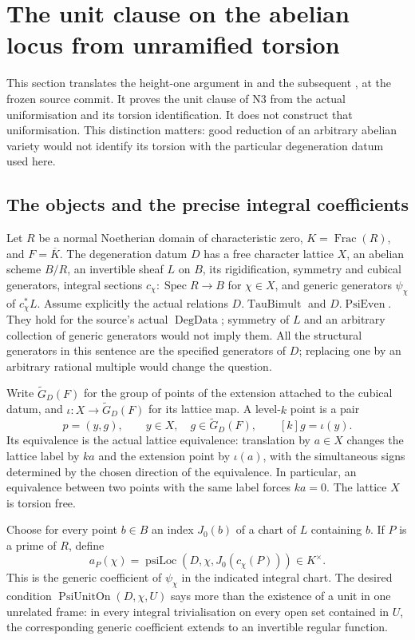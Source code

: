 \section{The unit clause on the abelian locus from unramified torsion}
\label{sec:psi-unit-source}
This section translates the height-one argument in
 and the subsequent
, at the frozen source commit.
It proves the unit clause of N3 from the actual uniformisation and its
torsion identification.  It does not construct that uniformisation.
This distinction matters: good reduction of an arbitrary abelian variety
would not identify its torsion with the particular degeneration datum
used here.

\subsection{The objects and the precise integral coefficients}
Let \(R\) be a normal Noetherian domain of characteristic zero,
\(K=\operatorname{Frac}(R)\), and \(F=\overline K\).
The degeneration datum \(D\) has a free character lattice \(X\), an
abelian scheme \(B/R\), an invertible sheaf \(L\) on \(B\), its
rigidification, symmetry and cubical generators, integral sections
\(c_\chi:\operatorname{Spec}R\to B\) for \(\chi\in X\), and generic
generators \(\psi_\chi\) of \(c_\chi^*L\).
Assume explicitly the actual relations \(D.\operatorname{TauBimult}\)
and \(D.\operatorname{PsiEven}\). They hold for the source's actual
\(\operatorname{DegData}\); symmetry of \(L\) and an arbitrary
collection of generic generators would not imply them.
All the structural generators in this sentence are the specified
generators of \(D\); replacing one by an arbitrary rational multiple
would change the question.

Write \(\widetilde G_D(F)\) for the group of points of the extension
attached to the cubical datum, and \(\iota:X\to\widetilde G_D(F)\) for
its lattice map.  A level-\(k\) point is a pair
\[
          p=(y,g),\qquad y\in X,\quad g\in\widetilde G_D(F),
          \qquad [k]g=\iota(y).
\]
Its equivalence is the actual lattice equivalence:
translation by \(a\in X\) changes the lattice label by \(ka\) and the
extension point by \(\iota(a)\), with the simultaneous signs determined
by the chosen direction of the equivalence.  In particular, an
equivalence between two points with the same label forces \(ka=0\).
The lattice \(X\) is torsion free.

Choose for every point \(b\in B\) an index \(J_0(b)\) of a chart of
\(L\) containing \(b\).  If \(P\) is a prime of \(R\), define
\[
 a_P(\chi)=\operatorname{psiLoc}(D,\chi,J_0(c_\chi(P)))\in K^\times.
 \tag{PU1}\label{eq:psi-local-coefficient}
\]
This is the generic coefficient of \(\psi_\chi\) in the indicated
integral chart.  The desired condition
\(\operatorname{PsiUnitOn}(D,\chi,U)\) says more than the existence of a
unit in one unrelated frame: in every integral trivialisation on every
open set contained in \(U\), the corresponding generic coefficient
extends to an invertible regular function.

